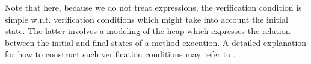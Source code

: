 Note that here, because we do not treat \oldOnly{} expressions, the verification condition is simple w.r.t. 
verification conditions which might take into account the initial state.
 The latter involves a modeling of the heap which expresses the relation between the initial and final states of a method execution. 
A detailed explanation for how to construct such verification conditions may refer to  \cite{CP03VTO}.

